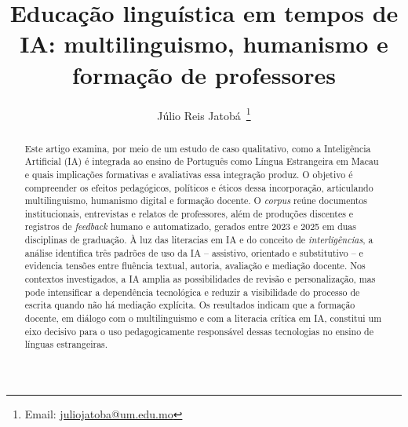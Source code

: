 \documentclass[portuguese]{textolivre}
\title{Educação linguística em tempos de IA: multilinguismo, humanismo e formação de professores}
\author[1]{Júlio Reis Jatobá~\orcid{0000-0001-5669-8119}\thanks{Email: \href{mailto:juliojatoba@um.edu.mo}{juliojatoba@um.edu.mo}}}
\affil[1]{University of Macau, Faculty of Arts and Humanities, Macau, China.}
\begin{document}
\maketitle

\begin{polyabstract}
\begin{abstract}
Este artigo examina, por meio de um estudo de caso qualitativo, como a Inteligência Artificial (IA) é integrada ao ensino de Português como Língua Estrangeira em Macau e quais implicações formativas e avaliativas essa integração produz. O objetivo é compreender os efeitos pedagógicos, políticos e éticos dessa incorporação, articulando multilinguismo, humanismo digital e formação docente. O \textit{corpus} reúne documentos institucionais, entrevistas e relatos de professores, além de produções discentes e registros de \textit{feedback} humano e automatizado, gerados entre 2023 e 2025 em duas disciplinas de graduação. À luz das literacias em IA e do conceito de \textit{interligências}, a análise identifica três padrões de uso da IA – assistivo, orientado e substitutivo – e evidencia tensões entre fluência textual, autoria, avaliação e mediação docente. Nos contextos investigados, a IA amplia as possibilidades de revisão e personalização, mas pode intensificar a dependência tecnológica e reduzir a visibilidade do processo de escrita quando não há mediação explícita. Os resultados indicam que a formação docente, em diálogo com o multilinguismo e com a literacia crítica em IA, constitui um eixo decisivo para o uso pedagogicamente responsável dessas tecnologias no ensino de línguas estrangeiras.

\end{abstract}


\end{polyabstract}
\end{document}
